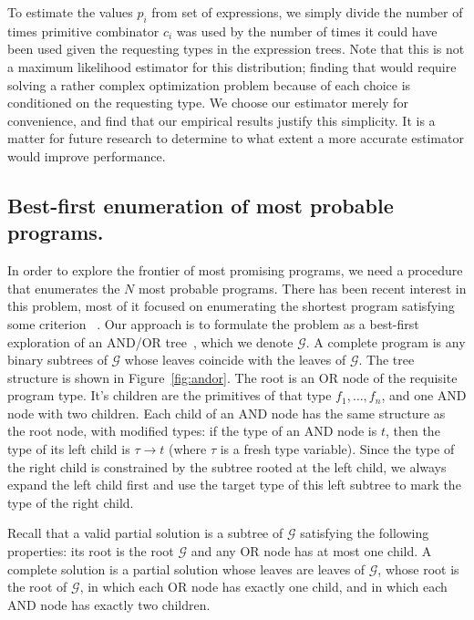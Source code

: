 \documentclass{article}
\begin{document}
To estimate the values $p_i$ from set of expressions, we simply divide
the number of times primitive combinator $c_i$ was used by the number
of times it could have been used given the requesting types in the
expression trees. Note that this is not a maximum likelihood estimator
for this distribution; finding that would require solving a rather
complex optimization problem because of each choice is conditioned on
the requesting type. We choose our estimator merely for convenience,
and find that our empirical results justify this simplicity. It is a
matter for future research to determine to what extent a more accurate
estimator would improve performance.

 \subsection{Best-first enumeration of most probable programs.}
In order to explore the frontier of most promising programs, we need a
procedure that enumerates the $N$ most probable programs. There has
been recent interest in this problem, most of it focused on
enumerating the shortest program satisfying some
criterion~\cite{DBLP:conf/sfp/Katayama05} \cite{DBLP:conf/aaip/YakushevJ09}. Our
approach is to formulate the problem as a best-first exploration of an
AND/OR tree~\cite{nilsson1982principles}, which we denote
$\mathcal{G}$. A complete program is any binary subtrees of
$\mathcal{G}$ whose leaves coincide with the leaves of
$\mathcal{G}$. The tree structure is shown in
Figure~\ref{fig:andor}. The root is an OR node of the requisite
program type. It's children are the primitives of that type $f_1,
\dots, f_n$, and one AND node with two children. Each child of an AND
node has the same structure as the root node, with modified types: if
the type of an AND node is $t$, then the type of its left child is
$\tau \rightarrow t$ (where $\tau$ is a fresh type variable). Since
the type of the right child is constrained by the subtree rooted at
the left child, we always expand the left child first and use the
target type of this left subtree to mark the type of the right child.

Recall that a valid partial solution is a subtree of $\mathcal{G}$
satisfying the following properties: its root is the root
$\mathcal{G}$ and any OR node has at most one child. A complete
solution is a partial solution whose leaves are leaves of
$\mathcal{G}$, whose root is the root of $\mathcal{G}$, in which each
OR node has exactly one child, and in which each AND node has exactly
two children. 
\end{document}
